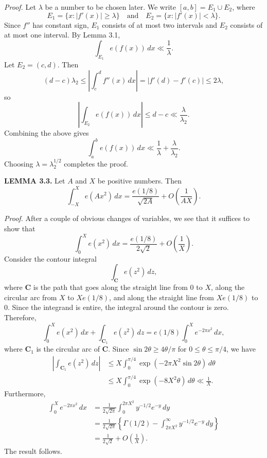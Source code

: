 \documentclass[10pt]{article}
\begin{document}
\noindent\textit{Proof.}
Let $\lambda$ be a number to be chosen later. We write
$[a,b]=E_1\cup E_2$, where
\[
 E_1=\{x:|f'(x)|\geq\lambda\}
 \quad\text{and}\quad
 E_2=\{x:|f'(x)|<\lambda\}.
\]
Since $f''$ has constant sign, $E_1$ consists of at most two intervals and
$E_2$ consists of at most one interval. By Lemma 3.1,
\[
 \int_{E_1}e(f(x))\,dx\ll\frac1\lambda.
\]
Let $E_2=(c,d)$. Then
\[
 (d-c)\lambda_2
 \leq\left|\int_c^d f''(x)\,dx\right|
 =|f'(d)-f'(c)|\leq2\lambda,
\]
so
\[
 \left|\int_{E_2}e(f(x))\,dx\right|\leq d-c\ll\frac{\lambda}{\lambda_2}.
\]
Combining the above gives
\[
 \int_a^b e(f(x))\,dx\ll\frac1\lambda+\frac{\lambda}{\lambda_2}.
\]
Choosing $\lambda=\lambda_2^{1/2}$ completes the proof.

\medskip
\noindent\textbf{LEMMA 3.3.}
Let $A$ and $X$ be positive numbers. Then
\[
 \int_{-X}^{X}e(Ax^2)\,dx
 =\frac{e(1/8)}{\sqrt{2A}}+O\left(\frac1{AX}\right).
\]

\noindent\textit{Proof.}
After a couple of obvious changes of variables, we see that it suffices to
show that
\[
 \int_0^X e(x^2)\,dx
 =\frac{e(1/8)}{2\sqrt2}+O\left(\frac1X\right).
\]
Consider the contour integral
\[
 \int_{\mathbf C}e(z^2)\,dz,
\]
where $\mathbf C$ is the path that goes along the straight line from $0$ to
$X$, along the circular arc from $X$ to $Xe(1/8)$, and along the straight line
from $Xe(1/8)$ to $0$. Since the integrand is entire, the integral around the
contour is zero. Therefore,
\[
 \int_0^X e(x^2)\,dx+\int_{\mathbf C_1}e(z^2)\,dz
 =e(1/8)\int_0^X e^{-2\pi x^2}\,dx,
\]
where $\mathbf C_1$ is the circular arc of $\mathbf C$. Since
$\sin 2\theta\geq4\theta/\pi$ for $0\leq\theta\leq\pi/4$, we have
\[
\begin{aligned}
 \left|\int_{\mathbf C_1}e(z^2)\,dz\right|
 &\leq X\int_0^{\pi/4}\exp(-2\pi X^2\sin 2\theta)\,d\theta \\
 &\leq X\int_0^{\pi/4}\exp(-8X^2\theta)\,d\theta
 \ll\frac1X.
\end{aligned}
\]
Furthermore,
\[
\begin{aligned}
 \int_0^X e^{-2\pi x^2}\,dx
 &=\frac{1}{2\sqrt{2\pi}}\int_0^{2\pi X^2}y^{-1/2}e^{-y}\,dy \\
 &=\frac{1}{2\sqrt{2\pi}}
   \left\{\Gamma(1/2)-\int_{2\pi X^2}^{\infty}y^{-1/2}e^{-y}\,dy\right\} \\
 &=\frac{1}{2\sqrt2}+O\left(\frac1X\right).
\end{aligned}
\]
The result follows.
\end{document}
